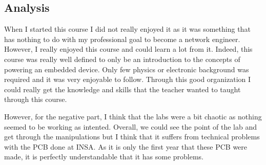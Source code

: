 \subsection{Analysis}

When I started this course I did not really enjoyed it as it was something that has nothing to do with my professional goal to become a network engineer. However, I really enjoyed this course and could learn a lot from it. Indeed, this course was really well defined to only be an introduction to the concepts of powering an embedded device. Only few physics or electronic background was required and it was very enjoyable to follow. Through this good organization I could really get the knowledge and skills that the teacher wanted to taught through this course.
\\\par

However, for the negative part, I think that the labs were a bit chaotic as nothing seemed to be working as intented. Overall, we could see the point of the lab and get through the manipulations but I think that it suffers from technical problems with the PCB done at INSA. As it is only the first year that these PCB were made, it is perfectly understandable that it has some problems. 